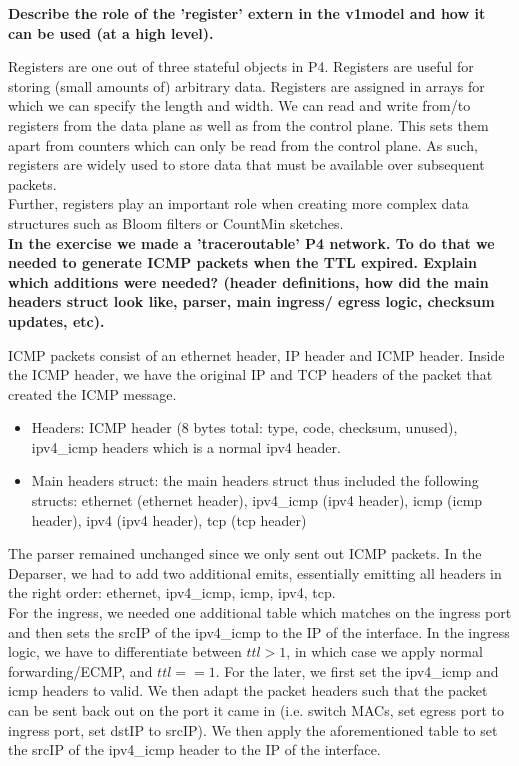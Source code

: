 \documentclass[11pt,oneside,a4paper]{article}
\begin{document}
\newpage

\noindent \textbf{Describe the role of the 'register' extern in the v1model and how it can be used (at a high level).}

Registers are one out of three stateful objects in P4. Registers are useful for storing (small amounts of) arbitrary data. Registers are assigned in arrays for which we can specify the length and width. We can read and write from/to registers from the data plane as well as from the control plane. This sets them apart from counters which can only be read from the control plane. As such, registers are widely used to store data that must be available over subsequent packets.\\
Further, registers play an important role when creating more complex data structures such as Bloom filters or CountMin sketches.\\


\noindent \textbf{In the exercise we made a 'traceroutable' P4 network. To do that we needed to generate ICMP packets when the TTL expired. Explain which additions were needed? (header definitions, how did the main headers struct look like, parser, main ingress/ egress logic, checksum updates, etc).}

ICMP packets consist of an ethernet header, IP header and ICMP header. Inside the ICMP header, we have the original IP and TCP headers of the packet that created the ICMP message.

\vspace{-\topsep}
\begin{itemize}
	\setlength{\itemsep}{0pt}
	\setlength{\parskip}{0pt}
	\item Headers: ICMP header (8 bytes total: type, code, checksum, unused), ipv4\_icmp headers which is a normal ipv4 header.
	\item Main headers struct: the main headers struct thus included the following structs: ethernet (ethernet header), ipv4\_icmp (ipv4 header), icmp (icmp header), ipv4 (ipv4 header), tcp (tcp header)
\end{itemize}
\vspace{-\topsep}

\noindent The parser remained unchanged since we only sent out ICMP packets. In the Deparser, we had to add two additional emits, essentially emitting all headers in the right order: ethernet, ipv4\_icmp, icmp, ipv4, tcp.\\
For the ingress, we needed one additional table which matches on the ingress port and then sets the srcIP of the ipv4\_icmp to the IP of the interface. In the ingress logic, we have to differentiate between $ttl > 1$, in which case we apply normal forwarding/ECMP, and $ttl == 1$. For the later, we first set the ipv4\_icmp and icmp headers to valid. We then adapt the packet headers such that the packet can be sent back out on the port it came in (i.e. switch MACs, set egress port to ingress port, set dstIP to srcIP). We then apply the aforementioned table to set the srcIP of the ipv4\_icmp header to the IP of the interface.



\label{lastpage} %
\clearpage
{}



\clearpage
\appendix
{}
\end{document}
